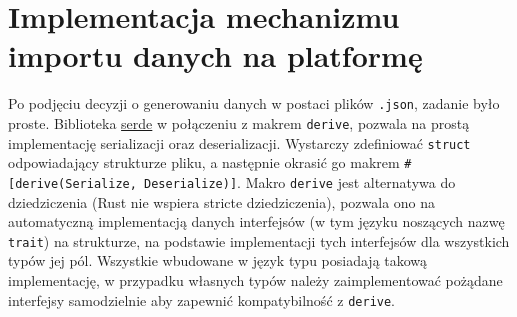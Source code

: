 \section{Implementacja mechanizmu importu danych na platformę}
Po podjęciu decyzji o generowaniu danych w postaci plików \texttt{.json}, zadanie było proste.
Biblioteka \href{https://crates.io/crates/serde}{serde} w połączeniu z makrem \texttt{derive},
pozwala na prostą implementację serializacji oraz deserializacji.
Wystarczy zdefiniować \texttt{struct} odpowiadający strukturze pliku, a następnie okrasić go makrem \texttt{\#[derive(Serialize, Deserialize)]}.
Makro \texttt{derive} jest alternatywa do dziedziczenia (Rust nie wspiera stricte dziedziczenia), pozwala ono na automatyczną implementacją danych interfejsów (w tym języku noszących nazwę \texttt{trait}) na strukturze,
na podstawie implementacji tych interfejsów dla wszystkich typów jej pól.
Wszystkie wbudowane w język typu posiadają takową implementację, w przypadku własnych typów należy zaimplementować pożądane interfejsy samodzielnie aby 
zapewnić kompatybilność z \texttt{derive}. \cite[]{RustDerive}
